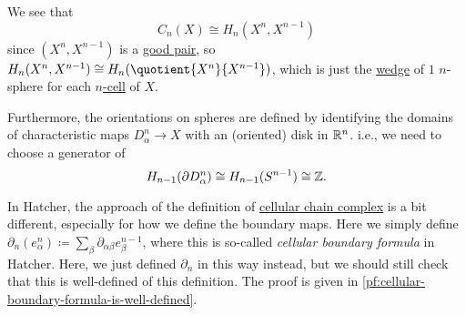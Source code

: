 \begin{remark}
	We see that
	\[
		C_{n} (X) \cong H_{n} (X^n, X^{n-1})
	\]
	since \((X^n, X^{n-1})\) is a \hyperref[def:good-pair]{good pair}, so \(H_{n} (X^n, X^{n-1}) \cong H_n(\quotient{X^n}{X^{n-1}})\), which is
	just the \hyperref[CW-complex-wedge-sum]{wedge} of \(1\) \(n\)-sphere for each \hyperref[def:cell]{\(n\)-cell} of \(X\).

	Furthermore, the orientations on spheres are defined by identifying the domains of characteristic maps 	\(D^n_\alpha \to X\) with an (oriented) disk in
	\(\mathbb{\MakeUppercase{r}} ^n\). i.e., we need to choose a generator of
	\[
		H_{n-1}(\partial D^n_\alpha) \cong H_{n-1}(S^{n-1})\cong \mathbb{\MakeUppercase{z}}.
	\]
\end{remark}
\begin{note}
	In Hatcher\cite{hatcher2002algebraic}, the approach of the definition of \hyperref[def:cellular-chain-complex]{cellular chain complex} is
	a bit different, especially for how we define the boundary maps. Here we simply define \(\partial _n(e^n_\alpha ) \coloneqq \sum_\beta \partial _{\alpha \beta }e^{n-1}_\beta\),
	where this is so-called \emph{cellular boundary formula} in Hatcher\cite{hatcher2002algebraic}. Here, we just defined \(\partial _n\) in this way instead, but
	we should still check that this is well-defined of this definition. The proof is given in \autoref{pf:cellular-boundary-formula-is-well-defined}.
\end{note}

